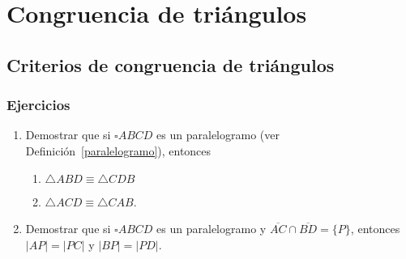 \chapter{Congruencia de triángulos}

\section{Criterios de congruencia de triángulos}


\subsection*{Ejercicios}
\begin{enumerate}
\item Demostrar que si $\square ABCD$ es un paralelogramo (ver Definición~\ref{paralelogramo}), entonces
\begin{enumerate}
\item $\triangle ABD\equiv\triangle CDB$
\item $\triangle ACD\equiv\triangle CAB$. \label{EPLI}
\end{enumerate}
\item Demostrar que si $\square ABCD$ es un paralelogramo y $\overline{AC}\cap\overline{BD}=\{P\}$, entonces $|AP|=|PC|$ y $|BP|=|PD|$. \label{IDDP}
\end{enumerate}


